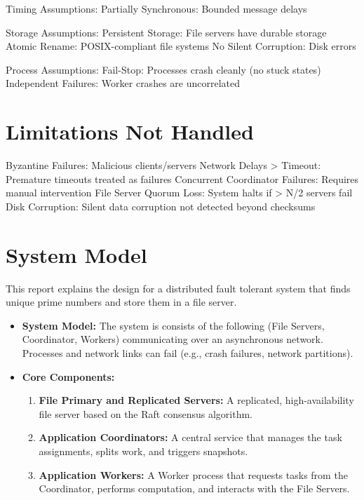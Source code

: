 \documentclass[11pt, a4paper]{article}
\begin{document}
Timing Assumptions:
Partially Synchronous:  Bounded message delays

Storage Assumptions:
Persistent Storage:     File servers have durable storage
Atomic Rename:          POSIX-compliant file systems
No Silent Corruption:   Disk errors

Process Assumptions:
Fail-Stop:              Processes crash cleanly (no stuck states)
Independent Failures:   Worker crashes are uncorrelated

\section{Limitations Not Handled}
Byzantine Failures:                 Malicious clients/servers
Network Delays > Timeout:           Premature timeouts treated as failures
Concurrent Coordinator Failures:    Requires manual intervention
File Server Quorum Loss:            System halts if > N/2 servers fail
Disk Corruption:                    Silent data corruption not detected beyond checksums

\section{System Model}

This report explains the design for a distributed fault tolerant system that finds unique prime numbers and store them in a file server.

\begin{itemize}
    \item \textbf{System Model:} The system is consists of the following (File Servers, Coordinator, Workers) communicating over an asynchronous network. Processes and network links can fail (e.g., crash failures, network partitions).

    \item \textbf{Core Components:}
          \begin{enumerate}
              \item \textbf{File Primary and Replicated Servers:} A replicated, high-availability file server based on the Raft consensus algorithm.
              \item \textbf{Application Coordinators:} A central service that manages the task assignments, splits work, and triggers snapshots.
              \item \textbf{Application Workers:} A Worker process that requests tasks from the Coordinator, performs computation, and interacts with the File Servers.
          \end{enumerate}
\end{itemize}
\end{document}
